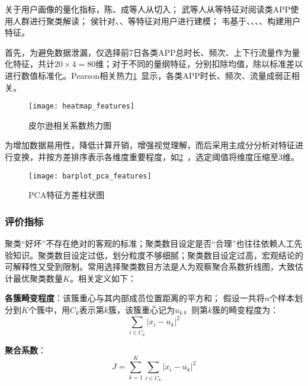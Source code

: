\documentclass[withoutpreface,bwprint]{cumcmthesis}
\begin{document}
关于用户画像的量化指标，陈\cite{陈纯}、成\cite{成雪}等人从切入；
武\cite{武慧娟}等人从等特征对阅读类APP使用人群进行聚类解读；
侯\cite{侯金凤}针对、、等特征对用户进行建模；
韦\cite{韦磊}基于、、、、构建用户特征。

首先，为避免数据泄漏，仅选择前7日各类APP总时长、频次、上下行流量作为量化特征，共计$20 \times 4=80$维；对于不同的量纲特征，分别扣除均值，除以标准差以进行数值标准化。Pearson相关热力\cref{fig:pearson}~显示，各类APP时长、频次、流量成弱正相关。

\begin{figure}[!htbp]
    \centering
    \texttt{[image: heatmap\_features]}
    \caption{皮尔逊相关系数热力图}
    \label{fig:pearson}
\end{figure}

为增加数据易用性，降低计算开销，增强视觉理解，而后采用主成分分析对特征进行变换，并按方差排序表示各维度重要程度，如\cref{fig:bar-pca}~，选定阈值将维度压缩至$3$维。

\begin{figure}[!htbp]
    \centering
    \texttt{[image: barplot\_pca\_features]}
    \caption{PCA特征方差柱状图}
    \label{fig:bar-pca}
\end{figure}

\subsubsection{评价指标}

聚类“好坏”不存在绝对的客观的标准\cite{机器学习}；聚类数目设定是否“合理”也往往依赖人工先验知识\cite{高维数据的聚类分析}。聚类数目设定过低，划分粒度不够细腻；聚类数目设定过高，宏观结论的可解释性又受到限制。常用选择聚类数目方法是人为观察聚合系数折线图，大致估计最优聚类数量$K$。相关定义如下：

\begin{definition}
    \textbf{各簇畸变程度}：该簇重心与其内部成员位置距离的平方和；
    假设一共将$n$个样本划分到$K$个簇中，用$C_k$表示第$k$簇，该簇重心记为$u_k$，则第$k$簇的畸变程度为：$$\sum_{i\in C_k} |x_i-u_k|^2$$
    \label{def:001}
\end{definition}

\begin{definition}
    \textbf{聚合系数}：$$J=\sum_{k=1}^{K} \sum_{i \in C_k} |x_i-u_k|^2$$
    \label{def:002}
\end{definition}
\end{document}
